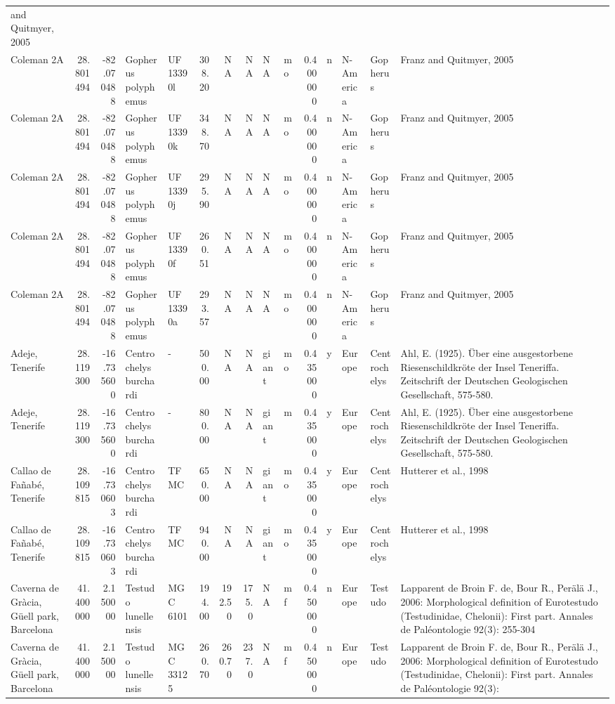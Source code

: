 \documentclass[]{article}
\begin{document}
\begin{longtable}[]{@{}lrrllrrrllrllll@{}}
and Quitmyer, 2005\tabularnewline
Coleman 2A & 28.801494 & -82.070488 & Gopherus polyphemus & UF 13390l &
308.20 & NA & NA & NA & mo & 0.400000 & n & N-America & Gopherus & Franz
and Quitmyer, 2005\tabularnewline
Coleman 2A & 28.801494 & -82.070488 & Gopherus polyphemus & UF 13390k &
348.70 & NA & NA & NA & mo & 0.400000 & n & N-America & Gopherus & Franz
and Quitmyer, 2005\tabularnewline
Coleman 2A & 28.801494 & -82.070488 & Gopherus polyphemus & UF 13390j &
295.90 & NA & NA & NA & mo & 0.400000 & n & N-America & Gopherus & Franz
and Quitmyer, 2005\tabularnewline
Coleman 2A & 28.801494 & -82.070488 & Gopherus polyphemus & UF 13390f &
260.51 & NA & NA & NA & mo & 0.400000 & n & N-America & Gopherus & Franz
and Quitmyer, 2005\tabularnewline
Coleman 2A & 28.801494 & -82.070488 & Gopherus polyphemus & UF 13390a &
293.57 & NA & NA & NA & mo & 0.400000 & n & N-America & Gopherus & Franz
and Quitmyer, 2005\tabularnewline
Adeje, Tenerife & 28.119300 & -16.735600 & Centrochelys burchardi & - &
500.00 & NA & NA & giant & mo & 0.435000 & y & Europe & Centrochelys &
Ahl, E. (1925). Über eine ausgestorbene Riesenschildkröte der Insel
Teneriffa. Zeitschrift der Deutschen Geologischen Gesellschaft,
575-580.\tabularnewline
Adeje, Tenerife & 28.119300 & -16.735600 & Centrochelys burchardi & - &
800.00 & NA & NA & giant & m & 0.435000 & y & Europe & Centrochelys &
Ahl, E. (1925). Über eine ausgestorbene Riesenschildkröte der Insel
Teneriffa. Zeitschrift der Deutschen Geologischen Gesellschaft,
575-580.\tabularnewline
Callao de Fañabé, Tenerife & 28.109815 & -16.730603 & Centrochelys
burchardi & TFMC & 650.00 & NA & NA & giant & mo & 0.435000 & y & Europe
& Centrochelys & Hutterer et al., 1998\tabularnewline
Callao de Fañabé, Tenerife & 28.109815 & -16.730603 & Centrochelys
burchardi & TFMC & 940.00 & NA & NA & giant & mo & 0.435000 & y & Europe
& Centrochelys & Hutterer et al., 1998\tabularnewline
Caverna de Gràcia, Güell park, Barcelona & 41.400000 & 2.150000 &
Testudo lunellensis & MGC 6101 & 194.00 & 192.50 & 175.0 & NA & mf &
0.450000 & n & Europe & Testudo & Lapparent de Broin F. de, Bour R.,
Perälä J., 2006: Morphological definition of Eurotestudo (Testudinidae,
Chelonii): First part. Annales de Paléontologie 92(3):
255-304\tabularnewline
Caverna de Gràcia, Güell park, Barcelona & 41.400000 & 2.150000 &
Testudo lunellensis & MGC 33125 & 260.70 & 260.70 & 237.0 & NA & mf &
0.450000 & n & Europe & Testudo & Lapparent de Broin F. de, Bour R.,
Perälä J., 2006: Morphological definition of Eurotestudo (Testudinidae,
Chelonii): First part. Annales de Paléontologie 92(3):

\end{longtable}
\end{document}
